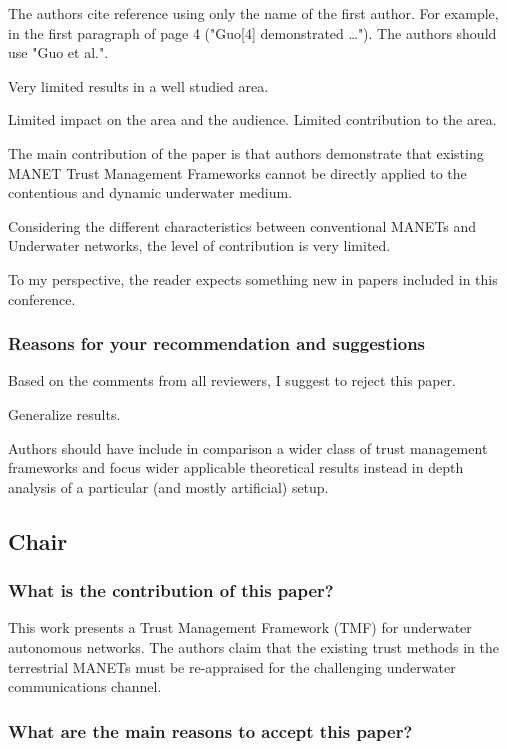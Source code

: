 \documentclass[runningheads,a4paper]{llncs}
\begin{document}
The authors cite reference \cite{Guo11} using only the name of the first author. For example, in the first paragraph of page 4 ("Guo[4] demonstrated …"). The authors should use "Guo et al.".

Very limited results in a well studied area.

Limited impact on the area and the audience. Limited contribution to the area.

The main contribution of the paper is that authors demonstrate that existing MANET Trust Management Frameworks cannot be directly applied to the contentious and dynamic underwater medium. 

Considering the different characteristics between conventional MANETs and Underwater networks, the level of contribution is very limited.

To my perspective, the reader expects something new in papers included in this conference. 

\subsubsection{Reasons for your recommendation and suggestions}

Based on the comments from all reviewers, I suggest to reject this paper.

Generalize results.

Authors should have include in comparison a wider class of trust management frameworks and focus wider applicable theoretical results instead in depth analysis of a particular (and mostly artificial) setup.


\subsection{Chair}
\subsubsection{What is the contribution of this paper?}

This work presents a Trust Management Framework (TMF) for underwater autonomous networks. The authors claim that the existing trust methods in the terrestrial MANETs must be re-appraised for the challenging underwater communications channel. 

\subsubsection{What are the main reasons to accept this paper?}
\end{document}

